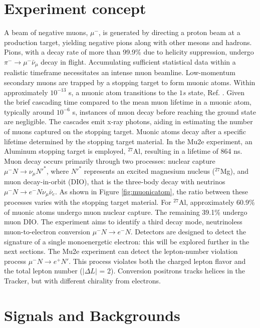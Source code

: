 \section{Experiment concept}
A beam of negative muons, $\mu ^-$, is generated by directing a proton beam at a production target, yielding negative pions along with other mesons and hadrons. 
Pions, with a decay rate of more than 99.9\% due to helicity suppression, undergo $\pi ^- \rightarrow \mu ^- \bar{\nu}_\mu$ decay in flight. 
Accumulating sufficient statistical data within a realistic timeframe necessitates an intense muon beamline. 
Low-momentum secondary muons are trapped by a stopping target to form muonic atoms. Within approximately $10^{-13}$ s, 
a muonic atom transitions to the $1s$ state, Ref. \cite{MEASDAY2001243}. 
Given the brief cascading time compared to the mean muon lifetime in a muonic atom, typically around $10^{-6}$ s, 
instances of muon decay before reaching the ground state are negligible. 
The cascades emit x-ray photons, aiding in estimating the number of muons captured on the stopping target. 
Muonic atoms decay after a specific lifetime determined by the stopping target material. 
In the Mu2e experiment, an Aluminum stopping target is employed, $^{27}$Al, resulting in a lifetime of 
864 ns. Muon decay occurs primarily through two processes: 
nuclear capture $\mu^- N \rightarrow \nu_\mu N'^* $, where $N'^*$ represents an excited 
magnesium nucleus ($^{27}$Mg), and muon decay-in-orbit (DIO), 
that is the three-body decay with neutrinos $\mu ^- N \rightarrow e^- N \nu_\mu \bar{\nu}_e$. 
As shown in Figure \ref{fig:muonicatom}, the ratio between these 
processes varies with the stopping target material. For $^{27}$Al, approximately 60.9\% 
of muonic atoms undergo muon nuclear capture. The remaining 39.1\% undergo muon DIO. 
The experiment aims to identify a third decay mode, neutrinoless muon-to-electron 
conversion $\mu^- N \rightarrow e^- N $. Detectors are designed to detect the signature of a 
single monoenergetic electron: this will be explored further in the next sections.
The Mu2e experiment can detect the lepton-number violation process $\mu^- N \rightarrow e^+ N'$.
This process violates both the charged lepton flavor and the total lepton number ($|\Delta L|$ = 2). 
Conversion positrons tracks helices in the Tracker, but with different chirality from electrons. 
\section{Signals and Backgrounds}\label{sigandbkg}
